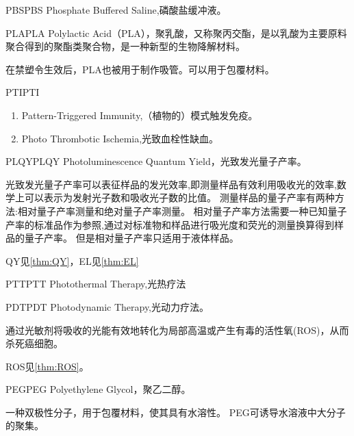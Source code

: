 \documentclass[cn,11pt,chinese]{elegantbook}
\begin{document}
\begin{theorem}{PBS}{PBS}
  Phosphate Buffered Saline,磷酸盐缓冲液。
  \end{theorem}

\begin{theorem}{PLA}{PLA}
  Polylactic Acid（PLA），聚乳酸，又称聚丙交酯，是以乳酸为主要原料聚合得到的聚酯类聚合物，是一种新型的生物降解材料。

  在禁塑令生效后，PLA也被用于制作吸管。可以用于包覆材料。
  \end{theorem}

  \begin{theorem}{PTI}{PTI}
    \begin{enumerate}
      \item Pattern-Triggered Immunity,（植物的）模式触发免疫。
      \item Photo Thrombotic Ischemia,光致血栓性缺血。
    \end{enumerate}
    
\end{theorem}

\begin{theorem}{PLQY}{PLQY}
Photoluminescence Quantum Yield，光致发光量子产率。

光致发光量子产率可以表征样品的发光效率,即测量样品有效利用吸收光的效率,数学上可以表示为发射光子数和吸收光子数的比值。
测量样品的量子产率有两种方法:相对量子产率测量和绝对量子产率测量。
相对量子产率方法需要一种已知量子产率的标准品作为参照,通过对标准物和样品进行吸光度和荧光的测量换算得到样品的量子产率。
但是相对量子产率只适用于液体样品。
\end{theorem}

\begin{note}
QY见\vref{thm:QY}，EL见\vref{thm:EL}
\end{note}


\begin{theorem}{PTT}{PTT}
  Photothermal Therapy,光热疗法
\end{theorem}

\begin{theorem}{PDT}{PDT}
  Photodynamic Therapy,光动力疗法。

  通过光敏剂将吸收的光能有效地转化为局部高温或产生有毒的活性氧(ROS)，从而杀死癌细胞。
\end{theorem}
\begin{note}
  ROS见\vref{thm:ROS}。
\end{note}

\begin{theorem}{PEG}{PEG} 
  Polyethylene Glycol，聚乙二醇。

  一种双极性分子，用于包覆材料，使其具有水溶性。
  PEG可诱导水溶液中大分子的聚集。
\end{theorem}
\end{document}

